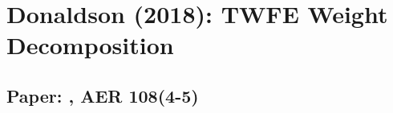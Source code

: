 \documentclass[12pt]{article}
\begin{document}
\section*{Donaldson (2018): TWFE Weight Decomposition}
\subsection*{Paper: , AER 108(4-5)}




\end{document}
